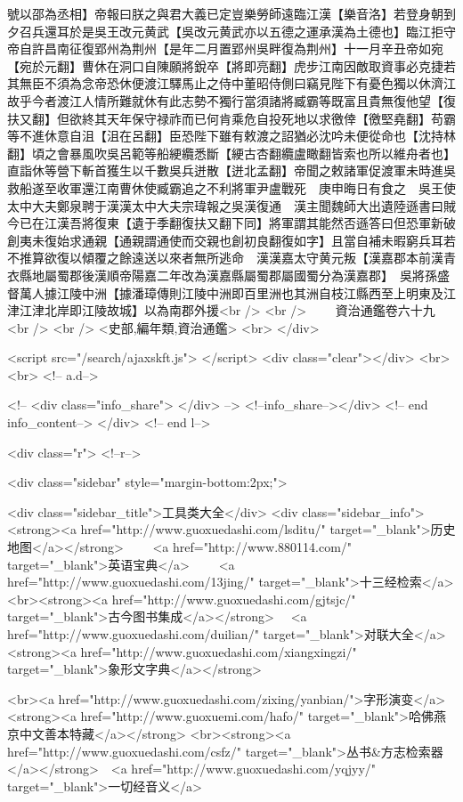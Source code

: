 號以邵為丞相】帝報曰朕之與君大義已定豈樂勞師遠臨江漢【樂音洛】若登身朝到夕召兵還耳於是吳王改元黄武【吳改元黄武亦以五德之運承漢為土德也】臨江拒守帝自許昌南征復郢州為荆州【是年二月置郢州吳畔復為荆州】十一月辛丑帝如宛【宛於元翻】曹休在洞口自陳願將銳卒【將即亮翻】虎步江南因敵取資事必克捷若其無臣不須為念帝恐休便渡江驛馬止之侍中董昭侍側曰竊見陛下有憂色獨以休濟江故乎今者渡江人情所難就休有此志勢不獨行當須諸將臧霸等既富且貴無復他望【復扶又翻】但欲終其天年保守禄祚而已何肯乘危自投死地以求徼倖【徼堅堯翻】苟霸等不進休意自沮【沮在呂翻】臣恐陛下雖有敕渡之詔猶必沈吟未便從命也【沈持林翻】頃之會暴風吹吳呂範等船綆纜悉斷【綆古杏翻纜盧瞰翻皆索也所以維舟者也】直詣休等營下斬首獲生以千數吳兵迸散【迸北孟翻】帝聞之敕諸軍促渡軍未時進吳救船遂至收軍還江南曹休使臧霸追之不利將軍尹盧戰死　庚申晦日有食之　吳王使太中大夫鄭泉聘于漢漢太中大夫宗瑋報之吳漢復通　漢主聞魏師大出遺陸遜書曰賊今已在江漢吾將復東【遺于季翻復扶又翻下同】將軍謂其能然否遜答曰但恐軍新破創夷未復始求通親【通親謂通使而交親也創初良翻復如字】且當自補未暇窮兵耳若不推算欲復以傾覆之餘遠送以來者無所逃命　漢漢嘉太守黄元叛【漢嘉郡本前漢青衣縣地屬蜀郡後漢順帝陽嘉二年改為漢嘉縣屬蜀郡屬國蜀分為漢嘉郡】　吳將孫盛督萬人據江陵中洲【據潘璋傳則江陵中洲即百里洲也其洲自枝江縣西至上明東及江津江津北岸即江陵故城】以為南郡外援<br />
<br />
　　資治通鑑卷六十九<br />
<br />
<史部,編年類,資治通鑑>  <br>
   </div> 

<script src="/search/ajaxskft.js"> </script>
 <div class="clear"></div>
<br>
<br>
 <!-- a.d-->

 <!--
<div class="info_share">
</div> 
-->
 <!--info_share--></div>   <!-- end info_content-->
  </div> <!-- end l-->

<div class="r">   <!--r-->



<div class="sidebar"  style="margin-bottom:2px;">

 
<div class="sidebar_title">工具类大全</div>
<div class="sidebar_info">
<strong><a href="http://www.guoxuedashi.com/lsditu/" target="_blank">历史地图</a></strong>　　
<a href="http://www.880114.com/" target="_blank">英语宝典</a>　　
<a href="http://www.guoxuedashi.com/13jing/" target="_blank">十三经检索</a>　
<br><strong><a href="http://www.guoxuedashi.com/gjtsjc/" target="_blank">古今图书集成</a></strong>　
<a href="http://www.guoxuedashi.com/duilian/" target="_blank">对联大全</a>　<strong><a href="http://www.guoxuedashi.com/xiangxingzi/" target="_blank">象形文字典</a></strong>　

<br><a href="http://www.guoxuedashi.com/zixing/yanbian/">字形演变</a>　　<strong><a href="http://www.guoxuemi.com/hafo/" target="_blank">哈佛燕京中文善本特藏</a></strong>
<br><strong><a href="http://www.guoxuedashi.com/csfz/" target="_blank">丛书&方志检索器</a></strong>　<a href="http://www.guoxuedashi.com/yqjyy/" target="_blank">一切经音义</a>　　

